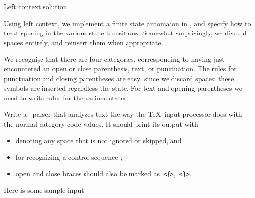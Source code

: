  {Left context solution}

Using left context, we implement a finite state automaton in \lex, and
specify how to treat spacing in the various state
transitions. Somewhat surprisingly, we discard spaces entirely, and
reinsert them when appropriate.

We recognise that there are four categories, corresponding to having
just encountered an open or close parenthesis, text, or
punctuation. The rules for punctuation and closing parentheses are
easy, since we discard spaces: these symbols are inserted regardless
the state. For text and opening parentheses we need to write rules for
the various states.


\begin{594exercise}
Write a \lex\ parser that analyzes text the way the \TeX\ input
processor does with the normal category code values. It should print
its output with
\begin{itemize}
\item {} denoting any space that is not ignored or skipped, and
\item {} for recognizing a control sequence
  ;
\item open and close braces should also be marked
as~\verb+<{>+,~\verb+<}>+.
\end{itemize}
Here is some sample input:

\end{594exercise}
\begin{answer}

\end{answer}
